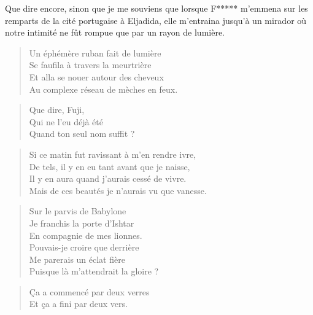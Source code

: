 \begin{prose}
Que dire encore, sinon que je me souviens que lorsque F***** m’emmena sur les remparts de la cité portugaise à Eljadida, elle m’entraina jusqu’à un mirador où notre intimité ne fût rompue que par un rayon de lumière.
\end{prose}

\begin{verse}
Un éphémère ruban fait de lumière\\
Se faufila à travers la meurtrière\\
Et alla se nouer autour des cheveux\\
Au complexe réseau de mèches en feux.
\end{verse}

\begin{verse}
Que dire, Fuji,\\
Qui ne l’eu déjà été\\
Quand ton seul nom suffit ?
\end{verse}

\begin{verse}
Si ce matin fut ravissant à m’en rendre ivre,\\
De tels, il y en eu tant avant que je naisse,\\
Il y en aura quand j’aurais cessé de vivre.\\
Mais de ces beautés je n’aurais vu que vanesse.
\end{verse}

\begin{verse}
Sur le parvis de Babylone\\
Je franchis la porte d’Ishtar\\
En compagnie de mes lionnes.\\
Pouvais-je croire que derrière\\
Me parerais un éclat fière\\
Puisque là m’attendrait la gloire ?
\end{verse}

\begin{verse}
Ça a commencé par deux verres\\
Et ça a fini par deux vers.
\end{verse}

